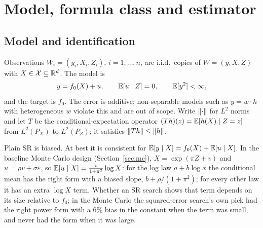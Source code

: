 \section{Model, formula class and estimator}
\label{sec:model}

\subsection{Model and identification}

Observations $W_i = (y_i, X_i, Z_i)$, $i = 1, \dots, n$, are i.i.d.\ copies of $W = (y, X, Z)$ with $X \in \mathcal{X} \subseteq \mathbb{R}^d$. The model is
\begin{equation}
y = f_0(X) + u, \qquad \mathbb{E}[u \mid Z] = 0, \qquad \mathbb{E}[y^2] < \infty,
\label{eq:model}
\end{equation}
and the target is $f_0$. The error is additive; non-separable models such as $y = w \cdot h$ with heterogeneous $w$ violate this and are out of scope. Write $\lVert \cdot\rVert$ for $L^2$ norms and let $T$ be the conditional-expectation operator $(Th)(z) = \mathbb{E}[h(X) \mid Z = z]$ from $L^2(P_X)$ to $L^2(P_Z)$; it satisfies $\lVert Th\rVert \le \lVert h\rVert$.

Plain SR is biased. At best it is consistent for $\mathbb{E}[y \mid X] = f_0(X) + \mathbb{E}[u \mid X]$. In the baseline Monte Carlo design (Section~\ref{sec:mc}), $X = \exp(\pi Z + v)$ and $u = \rho v + \sigma\varepsilon$, so $\mathbb{E}[u \mid X] = \frac{\rho}{1 + \pi^2}\log X$: for the log law $a + b\log x$ the conditional mean has the right form with a biased slope, $b + \rho/(1 + \pi^2)$; for every other law it has an extra $\log X$ term. Whether an SR search shows that term depends on its size relative to $f_0$; in the Monte Carlo the squared-error search's own pick had the right power form with a 6\% bias in the constant when the term was small, and never had the form when it was large.

